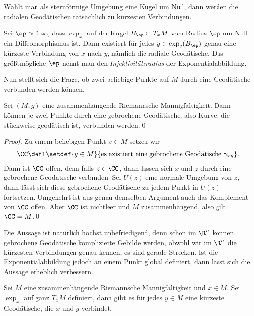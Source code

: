 \documentclass[%
	paper=a5,%
	fleqn,%
	DIV=18,%
	BCOR=0mm,
	fontsize=11pt,
	titlepage=false,%
	bibliography=totoc,
	DIV=18,%
	twoside=true,
	pdftitle=Riemannsche Geometrie,
	pdfauthor=Uwe Semmelmann,
	numbers=noendperiod]%
	{scrbook}
\begin{document}
Wählt man als sternförmige Umgebung eine Kugel um Null, dann werden die radialen Geodätischen tatsächlich zu kürzesten Verbindungen.

\begin{prop}
Sei $\ep > 0$ so, dass $\exp_{x}$ auf der Kugel $B_{\ep}\subset T_{x}M$ vom Radius $\ep$ um Null ein Diffeomorphismus ist. Dann existiert für jedes $y\in \exp_{x}(B_{\ep})$ genau eine kürzeste Verbindung von $x$ nach $y$, nämlich die radiale Geodätische. 
Das größtmögliche $\ep$ nennt man den \emph{Injektivitätsradius} der Exponentialabbildung.\fish
\end{prop}


Nun stellt sich die Frage, ob zwei beliebige Punkte auf $M$ durch eine Geodätische verbunden werden können.

\begin{prop}
Sei $(M,g)$ eine zusammenhängende Riemannsche Mannigfaltigkeit. Dann können je zwei Punkte durch eine gebrochene Geodätische, also Kurve, die stückweise geodätisch ist, verbunden werden.\qed
\end{prop}
\begin{proof}
Zu einem beliebigen Punkt $x\in M$ setzen wir
\begin{align*}
\CC \defl \setdef{y\in M}{\text{es existiert eine gebrochene Geodätische }\gamma_{{xy}}}.
\end{align*}
Dann ist $\CC$ offen, denn falls $z\in \CC$, dann lassen sich $x$ und $z$ durch eine gebrochene Geodätische verbinden. Sei $U(z)$ eine normale Umgebung von $z$, dann lässt sich diese gebrochene Geodätische zu jedem Punkt in $U(z)$ fortsetzen.
Umgekehrt ist aus genau demselben Argument auch das Komplement von $\CC$ offen. Aber $\CC$ ist nichtleer und $M$ zusammenhängend, also gilt $\CC = M$.\qed
\end{proof}

Die Aussage ist natürlich höchst unbefriedigend, denn schon im $\R^n$ können gebrochene Geodätische komplizierte Gebilde werden, obwohl wir im $\R^n$ die kürzesten Verbindungen genau kennen, es sind gerade Strecken. Ist die Exponentialabbildung jedoch an einem Punkt global definiert, dann lässt sich die Aussage erheblich verbessern.

\begin{prop}
Sei $M$ eine zusammenhängende Riemannsche Mannigfaltigkeit und $x\in M$. Sei $\exp_{x}$ auf ganz $T_{x}M$ definiert, dann gibt es für jedes $y\in M$ eine kürzeste Geodätische, die $x$ und $y$ verbindet.\fish
\end{prop}
\end{document}
